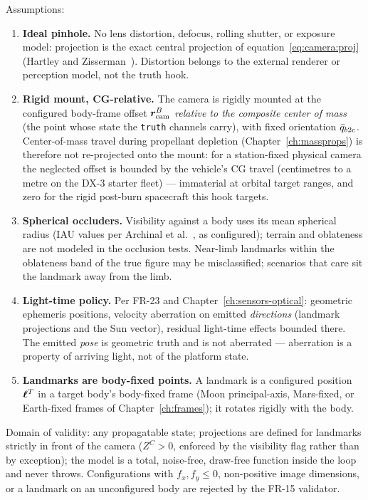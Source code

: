 Assumptions:
\begin{enumerate}
  \item \textbf{Ideal pinhole.} No lens distortion, defocus, rolling
    shutter, or exposure model: projection is the exact central
    projection of equation~\eqref{eq:camera:proj}
    (Hartley and Zisserman~\cite{hartley2004}). Distortion belongs to
    the external renderer or perception model, not the truth hook.
  \item \textbf{Rigid mount, CG-relative.} The camera is rigidly mounted
    at the configured body-frame offset $\bm{r}_{\mathrm{cam}}^{B}$
    \emph{relative to the composite center of mass} (the point whose
    state the \texttt{truth} channels carry), with fixed orientation
    $\bar{q}_{b2c}$. Center-of-mass travel during propellant depletion
    (Chapter~\ref{ch:massprops}) is therefore not re-projected onto the
    mount: for a station-fixed physical camera the neglected offset is
    bounded by the vehicle's CG travel (centimetres to a metre on the
    DX-3 starter fleet) --- immaterial at orbital target ranges, and
    zero for the rigid post-burn spacecraft this hook targets.
  \item \textbf{Spherical occluders.} Visibility against a body uses
    its mean spherical radius (IAU values per Archinal et
    al.~\cite{archinal2018}, as configured); terrain and oblateness are
    not modeled in the occlusion tests. Near-limb landmarks within the
    oblateness band of the true figure may be misclassified; scenarios
    that care sit the landmark away from the limb.
  \item \textbf{Light-time policy.} Per FR-23 and
    Chapter~\ref{ch:sensors-optical}: geometric ephemeris positions,
    velocity aberration on emitted \emph{directions} (landmark
    projections and the Sun vector), residual light-time effects
    bounded there. The emitted \emph{pose} is geometric truth and is
    not aberrated --- aberration is a property of arriving light, not
    of the platform state.
  \item \textbf{Landmarks are body-fixed points.} A landmark is a
    configured position $\bm{\ell}^{T}$ in a target body's body-fixed
    frame (Moon principal-axis, Mars-fixed, or Earth-fixed frames of
    Chapter~\ref{ch:frames}); it rotates rigidly with the body.
\end{enumerate}

Domain of validity: any propagatable state; projections are defined for
landmarks strictly in front of the camera ($Z^{C} > 0$, enforced by the
visibility flag rather than by exception); the model is a total,
noise-free, draw-free function inside the loop and never throws.
Configurations with $f_x, f_y \le 0$, non-positive image dimensions, or
a landmark on an unconfigured body are rejected by the FR-15 validator.

